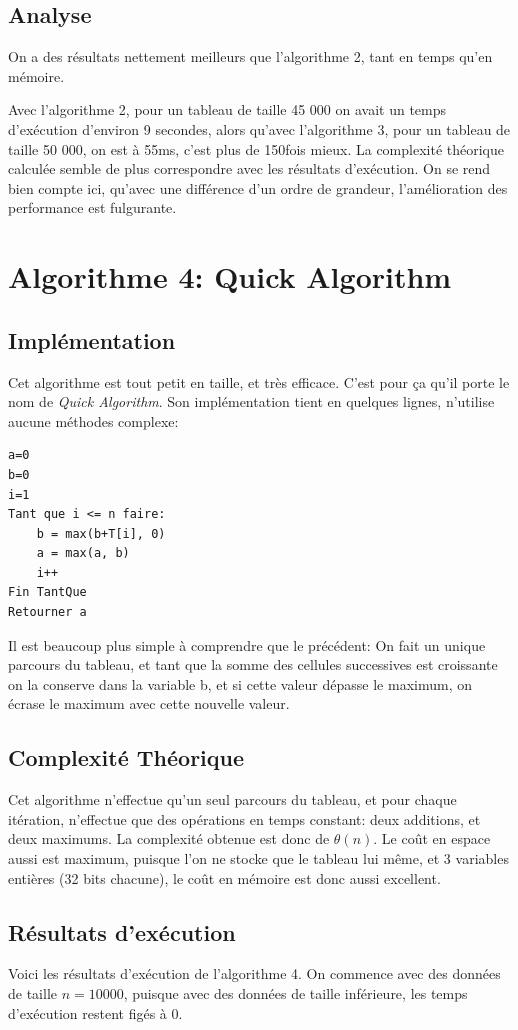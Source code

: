 \documentclass[a4paper, 12pt]{article}
\begin{document}
\subsection{Analyse}
On a des résultats nettement meilleurs que l'algorithme 2, tant en temps qu'en mémoire.

Avec l'algorithme 2, pour un tableau de taille 45 000 on avait un temps d'exécution d'environ 9 secondes, alors qu'avec l'algorithme 3, pour un tableau de taille 50 000, on est à 55ms, c'est plus de 150fois mieux.
La complexité théorique calculée semble de plus correspondre avec les résultats d'exécution. On se rend bien compte ici, qu'avec une différence d'un ordre de grandeur, l'amélioration des performance est fulgurante. 
 
\section{Algorithme 4: Quick Algorithm}
\subsection{Implémentation}
Cet algorithme est tout petit en taille, et très efficace. C'est pour ça qu'il porte le nom de \emph{Quick Algorithm}. Son implémentation tient en quelques lignes, n'utilise aucune méthodes complexe:
\begin{verbatim}
a=0
b=0
i=1
Tant que i <= n faire:
    b = max(b+T[i], 0)
    a = max(a, b)
    i++
Fin TantQue
Retourner a
\end{verbatim}
Il est beaucoup plus simple à comprendre que le précédent: On fait un unique parcours du tableau, et tant que la somme des cellules successives est croissante on la conserve dans la variable b, et si cette valeur dépasse le maximum, on écrase le maximum avec cette nouvelle valeur.
\subsection{Complexité Théorique}
Cet algorithme n'effectue qu'un seul parcours du tableau, et pour chaque itération, n'effectue que des opérations en temps constant: deux additions, et deux maximums. 
La complexité obtenue est donc de $\theta(n)$. Le coût en espace aussi est maximum, puisque l'on ne stocke que le tableau lui même, et 3 variables entières (32 bits chacune), le coût en mémoire est donc aussi excellent.  
\subsection{Résultats d’exécution}
Voici les résultats d'exécution de l'algorithme 4. On commence avec des données de taille $n=10000$, puisque avec des données de taille inférieure, les temps d'exécution restent figés à 0. 
\end{document}
